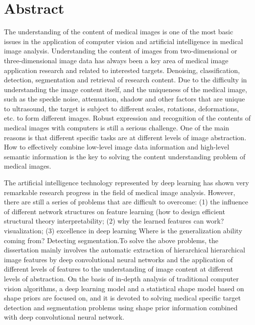 

\chapter*{Abstract}%
  The understanding of the content of medical images is one of the most basic issues in the application of computer vision and artificial intelligence in medical image analysis. Understanding the content of images from two-dimensional or three-dimensional image data has always been a key area of ​​medical image application research and related to interested targets. Denoising, classification, detection, segmentation and retrieval of research content. Due to the difficulty in understanding the image content itself, and the uniqueness of the medical image, such as the speckle noise, attenuation, shadow and other factors that are unique to ultrasound, the target is subject to different scales, rotations, deformations, etc. to form different images. Robust expression and recognition of the contents of medical images with computers is still a serious challenge. One of the main reasons is that different specific tasks are at different levels of image abstraction. How to effectively combine low-level image data information and high-level semantic information is the key to solving the content understanding problem of medical images.

  The artificial intelligence technology represented by deep learning has shown very remarkable research progress in the field of medical image analysis. However, there are still a series of problems that are difficult to overcome: (1) the influence of different network structures on feature learning (how to design efficient structural theory interpretability; (2) why the learned features can work? visualization; (3) excellence in deep learning Where is the generalization ability coming from? Detecting segmentation.To solve the above problems, the dissertation mainly involves the automatic extraction of hierarchical hierarchical image features by deep convolutional neural networks and the application of different levels of features to the understanding of image content at different levels of abstraction. On the basis of in-depth analysis of traditional computer vision algorithms, a deep learning model and a statistical shape model based on shape priors are focused on, and it is devoted to solving medical specific target detection and segmentation problems using shape prior information combined with deep convolutional neural network.
  
